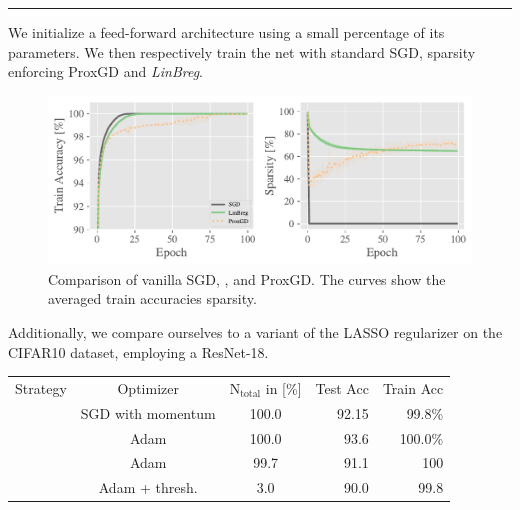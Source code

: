 \newlength\bottomstripheight%
\setlength{\bottomstripheight}{.25\textheight}%
%
\begin{minipage}[t]{\textwidth}%
\vskip0pt%
\textcolor{BaseColor}{%
\rule{\textwidth}{.2mm}%
}\hfill%
%
%
\begin{minipage}[b][\bottomstripheight][b]{.48\textwidth}%
%
%
\small%
We initialize a feed-forward architecture using a small percentage of its parameters. We then respectively train the net with standard SGD, sparsity enforcing ProxGD and \emph{LinBreg}.
\begin{figure}
\begin{minipage}{.7\textwidth}%
\includegraphics[width=\textwidth, trim= 0cm 0cm 0cm 0cm,clip]{atelier/SGDvsBreg_small.pdf}
\end{minipage}%
\begin{minipage}{.3\textwidth}%
\caption{\small Comparison of vanilla SGD, \LinBreg{}, and ProxGD.
The curves show the averaged train accuracies sparsity.}
\end{minipage}%
\end{figure}%
%
%
%
\vfill%
Additionally, we compare ourselves to a variant of the LASSO \cite{tibshirani1996regression} regularizer on the CIFAR10 dataset, employing a ResNet-18.
%
%
%
\begin{table}[htb]
\scriptsize
\begin{minipage}{.69\textwidth}%
\begin{tabularx}{\textwidth}{|c||c c|R R|}
Strategy & Optimizer & 
$\mathrm{N}_{\mathrm{total}}$ in [\%] & 
Test Acc&Train Acc\\
\hhline{|=====|}
&SGD with momentum &100.0&92.15&99.8\%\\
&Adam &100.0&93.6&100.0\%\\
\hhline{-----}
        &Adam &99.7&91.1 &100\\
        &Adam + thresh.&3.0&90.0 &99.8\\

\end{tabularx}
\end{minipage}
\end{table}
\end{minipage}
\end{minipage}
